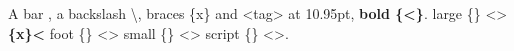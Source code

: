 \documentclass[11pt]{article}
\begin{document}
A bar \textbar, a backslash \textbackslash, braces \{x\} and \textless tag\textgreater{} at 10.95pt, \textbf{bold \{\textless\}}.
{\large large \{\textbar\} \textless\textgreater{} \bfseries \{x\}\textless} {\footnotesize foot \{\textbar\} \textless\textgreater}
{\small small \{\textbar\} \textless\textgreater} {\scriptsize script \{\textbar\} \textless\textgreater}.
\end{document}

